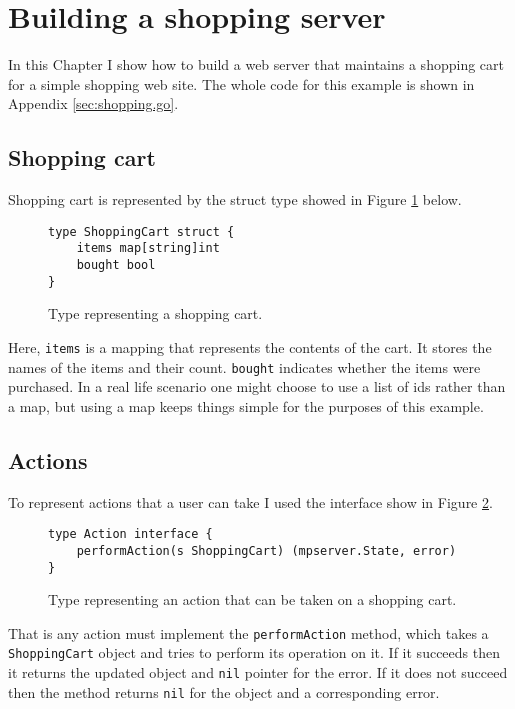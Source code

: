 \section{Building a shopping server}
\label{sec:shopping}
In this Chapter I show how to build a web server that
maintains a shopping cart for a simple shopping web site. The whole 
code for this example is shown in Appendix \ref{sec:shopping.go}.

\subsection{Shopping cart}
Shopping cart is represented by the struct type showed in Figure 
\ref{fig:shoppingCart} below.
\begin{figure}[h]
\begin{lstlisting}
type ShoppingCart struct {
    items map[string]int
    bought bool
}
\end{lstlisting}
\caption[scale=1.0]{Type representing a shopping cart.}
\label{fig:shoppingCart}
\end{figure}

Here, \texttt{items} is 
a mapping that represents the contents of the cart. It stores the names
of the items and their count. \texttt{bought} indicates whether the items
were purchased. In a real life scenario one might choose to use 
a list of ids rather than a map, but using a map keeps things simple
for the purposes of this example.

\subsection{Actions}
To represent actions that a user can take I used the interface show in 
Figure \ref{fig:action}.
\begin{figure}[h]
\begin{lstlisting}
type Action interface {
    performAction(s ShoppingCart) (mpserver.State, error)
}
\end{lstlisting}
\caption[scale=1.0]{Type representing an action that can be taken on 
a shopping cart.}
\label{fig:action}
\end{figure}
That is any action must implement the \texttt{performAction} method, which takes
a \texttt{ShoppingCart} object and tries to perform its operation on it. If
it succeeds then it returns the updated object and \texttt{nil} pointer for the
error. If it does not succeed then the method returns \texttt{nil} for the
object and a corresponding error.

